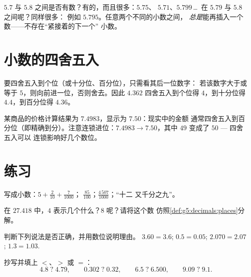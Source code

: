 \begin{example}[在两个小数之间插入新数]\label{ex:g5:decimals:between}
$5.7$ 与 $5.8$ 之间是否有数？有的，而且很多：$5.75$、
$5.71$、$5.799$\,\dots\ 在 $5.79$ 与 $5.8$ 之间呢？同样很多：
例如 $5.795$。任意两个不同的小数之间，
\emph{总是}能再插入一个数——不存在“紧接着的下一个”
小数。
\end{example}

\section{小数的四舍五入}

\begin{definition}[四舍五入]\label{def:g5:decimals:round}
要四舍五入到个位（或十分位、百分位），只需看其后一位数字：
若该数字大于或等于 $5$，则向前进一位，否则舍去。因此 $4.362$
四舍五入到个位得 $4$，到十分位得 $4.4$，到百分位得 $4.36$。
\end{definition}

\begin{example}[钱款精确到分]\label{ex:g5:decimals:money}
某商品的价格计算结果为 $7.4983$，显示为 $7.50$：现实中的金额
通常四舍五入到百分位（即精确到分）。注意连锁进位：$7.4983 \to
7.50$，其中 $49$ 变成了 $50$ --- 四舍五入可以
连锁影响好几个数位。
\end{example}

\section{练习}

\begin{exercise}[$\star$]\label{exo:g5:decimals:1}
写成小数：$5 + \frac{2}{10} + \frac{7}{1000}$；
\quad $\frac{85}{100}$；\quad $\frac{4\,507}{1000}$；\quad “十二
又千分之九”。
\end{exercise}

\begin{exercise}[$\star$]\label{exo:g5:decimals:2}
在 $27.418$ 中，$4$ 表示几个什么？$8$ 呢？请将这个数
仿照\cref{def:g5:decimals:places}分解。
\end{exercise}

\begin{exercise}[$\star$]\label{exo:g5:decimals:3}
判断下列说法是否正确，并用数位说明理由。
$3.60 = 3.6$; \quad $0.5 = 0.05$; \quad $2.070 = 2.07$; \quad
$1.3 = 1.03$.
\end{exercise}

\begin{exercise}[$\star$]\label{exo:g5:decimals:4}
抄写并填上 $<$、$>$ 或 $=$：
\[
4.8 \;?\; 4.79, \qquad
0.302 \;?\; 0.32, \qquad
6.5 \;?\; 6.500, \qquad
9.09 \;?\; 9.1 .
\]
\end{exercise}


